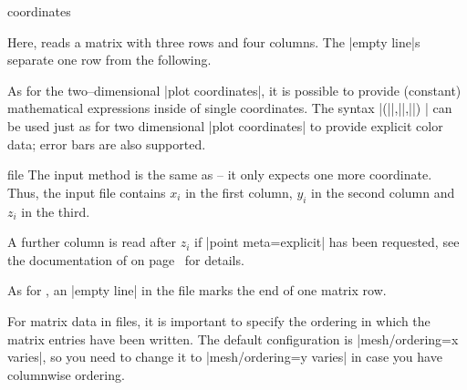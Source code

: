 {\begin{addplot3operation}[]{coordinates}{}
\begin{codeexample}[]
\end{codeexample}
	\noindent Here,  reads a matrix with three rows and four columns. The |empty line|s separate one row from the following.

	As for the two--dimensional |plot coordinates|, it is possible to provide (constant) mathematical expressions inside of single coordinates. The syntax |(||,||,||) | can be used just as for two dimensional |plot coordinates| to provide explicit color data; error bars are also supported.
\end{addplot3operation}

\begin{addplot3operation}[]{file}{}
	The  input method is the same as  -- it only expects one more coordinate.
	Thus, the input file contains $x_i$ in the first column, $y_i$ in the second column and $z_i$ in the third. 
	
	A further column is read after $z_i$ if |point meta=explicit| has been requested, see the documentation of  on page~\pageref{pgfplots:addplot:file} for details.
	
	As for , an |empty line| in the file marks the end of one matrix row.
\begin{codeexample}[]
\end{codeexample}

	For matrix data in files, it is important to specify the ordering in which the matrix entries have been written. The default configuration is |mesh/ordering=x varies|, so you need to change it to |mesh/ordering=y varies| in case you have columnwise ordering.
\end{addplot3operation}

}
